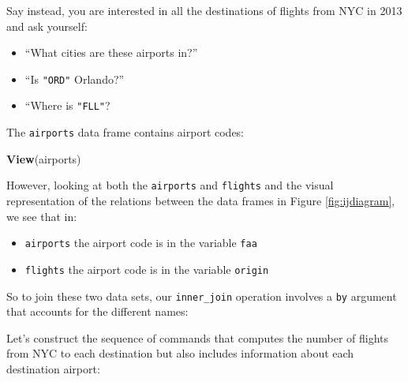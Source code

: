 \documentclass[]{tufte-book}
\newenvironment{Shaded}{\begin{snugshade}}{\end{snugshade}}
\newcommand{\KeywordTok}[1]{\textcolor[rgb]{0.13,0.29,0.53}{\textbf{{#1}}}}
\newcommand{\DataTypeTok}[1]{\textcolor[rgb]{0.13,0.29,0.53}{{#1}}}
\newcommand{\StringTok}[1]{\textcolor[rgb]{0.31,0.60,0.02}{{#1}}}
\newcommand{\NormalTok}[1]{{#1}}
\providecommand{\tightlist}{%
  \setlength{\itemsep}{0pt}\setlength{\parskip}{0pt}}
\begin{document}
Say instead, you are interested in all the destinations of flights from
NYC in 2013 and ask yourself:

\begin{itemize}
\tightlist
\item
  ``What cities are these airports in?''
\item
  ``Is \texttt{"ORD"} Orlando?''
\item
  ``Where is \texttt{"FLL"}?
\end{itemize}

The \texttt{airports} data frame contains airport codes:

\begin{Shaded}
\begin{Highlighting}[]
\KeywordTok{View}\NormalTok{(airports)}
\end{Highlighting}
\end{Shaded}

However, looking at both the \texttt{airports} and \texttt{flights} and
the visual representation of the relations between the data frames in
Figure \ref{fig:ijdiagram}, we see that in:

\begin{itemize}
\tightlist
\item
  \texttt{airports} the airport code is in the variable \texttt{faa}
\item
  \texttt{flights} the airport code is in the variable \texttt{origin}
\end{itemize}

So to join these two data sets, our \texttt{inner\_join} operation
involves a \texttt{by} argument that accounts for the different names:

\begin{Shaded}
\end{Shaded}

Let's construct the sequence of commands that computes the number of
flights from NYC to each destination but also includes information about
each destination airport:

\begin{Shaded}
\end{Shaded}
\end{document}
